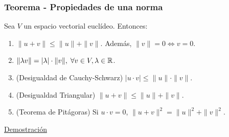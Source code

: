 \documentclass[12pt, a4paper, ones, notitlepage, openany,titlepage]{article}
\newcommand{\demostracion}{\noindent\underline{Demostración}}
\begin{document}
\subsubsection{Teorema - Propiedades de una norma}
\noindent Sea $V$ un espacio vectorial euclídeo. Entonces:
\begin{enumerate}
	\item  $\|u + v \| \le \|u\| + \|v\|$. Además, $\|v\| = 0 \Longleftrightarrow v = 0$.
	\item $\|\lambda v\| = |\lambda| \cdot \|v\| \space, \; \forall v \in V, \lambda \in \mathbb{R}$.
	\item (Desigualdad de Cauchy-Schwarz) 
	$|u \cdot v| \le \|u\| \cdot \|v\|$.
	\item (Desigualdad Triangular) $\|u + v\| \le \|u\| + \|v\|$.
	\item (Teorema de Pitágoras) Si $u \cdot v = 0$, $\|u + v\|^{2} = \|u\|^{2} + \|v\|^{2}$.
\end{enumerate}
\demostracion
\end{document}
